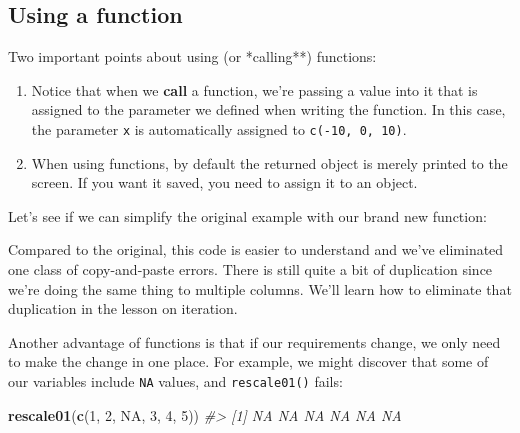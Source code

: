 \documentclass[]{book}
\newenvironment{Shaded}{\begin{snugshade}}{\end{snugshade}}
\newcommand{\KeywordTok}[1]{\textcolor[rgb]{0.13,0.29,0.53}{\textbf{#1}}}
\newcommand{\DecValTok}[1]{\textcolor[rgb]{0.00,0.00,0.81}{#1}}
\newcommand{\StringTok}[1]{\textcolor[rgb]{0.31,0.60,0.02}{#1}}
\newcommand{\CommentTok}[1]{\textcolor[rgb]{0.56,0.35,0.01}{\textit{#1}}}
\newcommand{\OtherTok}[1]{\textcolor[rgb]{0.56,0.35,0.01}{#1}}
\newcommand{\OperatorTok}[1]{\textcolor[rgb]{0.81,0.36,0.00}{\textbf{#1}}}
\newcommand{\NormalTok}[1]{#1}
\begin{document}
\subsection{Using a function}\label{using-a-function}

Two important points about using (or *calling**) functions:

\begin{enumerate}
\def\labelenumi{\arabic{enumi}.}
\item
  Notice that when we \textbf{call} a function, we're passing a value
  into it that is assigned to the parameter we defined when writing the
  function. In this case, the parameter \texttt{x} is automatically
  assigned to \texttt{c(-10,\ 0,\ 10)}.
\item
  When using functions, by default the returned object is merely printed
  to the screen. If you want it saved, you need to assign it to an
  object.
\end{enumerate}

Let's see if we can simplify the original example with our brand new
function:

\begin{Shaded}
\end{Shaded}

Compared to the original, this code is easier to understand and we've
eliminated one class of copy-and-paste errors. There is still quite a
bit of duplication since we're doing the same thing to multiple columns.
We'll learn how to eliminate that duplication in the lesson on
iteration.

Another advantage of functions is that if our requirements change, we
only need to make the change in one place. For example, we might
discover that some of our variables include \texttt{NA} values, and
\texttt{rescale01()} fails:

\begin{Shaded}
\begin{Highlighting}[]
\KeywordTok{rescale01}\NormalTok{(}\KeywordTok{c}\NormalTok{(}\DecValTok{1}\NormalTok{, }\DecValTok{2}\NormalTok{, }\OtherTok{NA}\NormalTok{, }\DecValTok{3}\NormalTok{, }\DecValTok{4}\NormalTok{, }\DecValTok{5}\NormalTok{))}
\CommentTok{#> [1] NA NA NA NA NA NA}
\end{Highlighting}
\end{Shaded}
\end{document}
